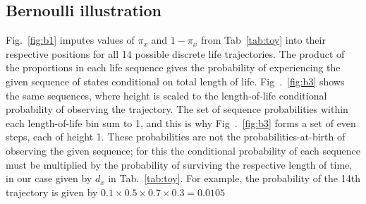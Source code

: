 \documentclass[a4paper]{article}
\begin{document}
\subsection{Bernoulli illustration}
Fig.~\ref{fig:b1} imputes values of $\pi_x$ and $1-\pi_x$ from Tab~\ref{tab:toy} into their respective positions for all 14 possible discrete life trajectories. The product of the proportions in each life sequence
gives the probability of experiencing the given sequence of states conditional on total length of life. Fig~.~\ref{fig:b3} shows the same sequences, where height is scaled to the length-of-life conditional probability of observing the trajectory. The set of sequence probabilities within each length-of-life bin sum to 1, and this is why Fig~.~\ref{fig:b3} forms a set of even steps, each of height 1. These probabilities are not the probabilities-at-birth of observing the given sequence; for this the conditional probability of each sequence must be multiplied by the probability of surviving the respective length of time, in our case given by $d_x$ in Tab.~\ref{tab:toy}. For example, the probability of the 14th trajectory is given by $0.1\times 0.5\times 0.7\times 0.3 = 0.0105$
\end{document}
